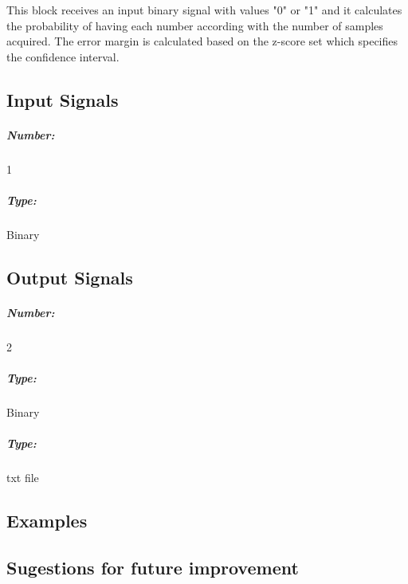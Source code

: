 This block receives an input binary signal with values "0" \space or "1" \space and it calculates the probability of having each number according with the number of samples acquired. The error margin is calculated based on the z-score set which specifies the confidence interval.

\subsection*{Input Signals}


\subparagraph*{Number:} 1

\subparagraph*{Type:} Binary 

\subsection*{Output Signals}

\subparagraph*{Number:} 2

\subparagraph*{Type:} Binary 
\subparagraph*{Type:} txt file

\subsection*{Examples}



\subsection*{Sugestions for future improvement}



